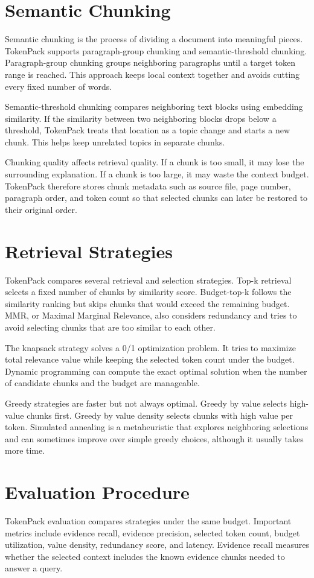 \documentclass[11pt]{article}
\begin{document}
\section{Semantic Chunking}
Semantic chunking is the process of dividing a document into meaningful pieces. TokenPack supports paragraph-group chunking and semantic-threshold chunking. Paragraph-group chunking groups neighboring paragraphs until a target token range is reached. This approach keeps local context together and avoids cutting every fixed number of words.

Semantic-threshold chunking compares neighboring text blocks using embedding similarity. If the similarity between two neighboring blocks drops below a threshold, TokenPack treats that location as a topic change and starts a new chunk. This helps keep unrelated topics in separate chunks.

Chunking quality affects retrieval quality. If a chunk is too small, it may lose the surrounding explanation. If a chunk is too large, it may waste the context budget. TokenPack therefore stores chunk metadata such as source file, page number, paragraph order, and token count so that selected chunks can later be restored to their original order.

\section{Retrieval Strategies}
TokenPack compares several retrieval and selection strategies. Top-k retrieval selects a fixed number of chunks by similarity score. Budget-top-k follows the similarity ranking but skips chunks that would exceed the remaining budget. MMR, or Maximal Marginal Relevance, also considers redundancy and tries to avoid selecting chunks that are too similar to each other.

The knapsack strategy solves a 0/1 optimization problem. It tries to maximize total relevance value while keeping the selected token count under the budget. Dynamic programming can compute the exact optimal solution when the number of candidate chunks and the budget are manageable.

Greedy strategies are faster but not always optimal. Greedy by value selects high-value chunks first. Greedy by value density selects chunks with high value per token. Simulated annealing is a metaheuristic that explores neighboring selections and can sometimes improve over simple greedy choices, although it usually takes more time.

\section{Evaluation Procedure}
TokenPack evaluation compares strategies under the same budget. Important metrics include evidence recall, evidence precision, selected token count, budget utilization, value density, redundancy score, and latency. Evidence recall measures whether the selected context includes the known evidence chunks needed to answer a query.
\end{document}
